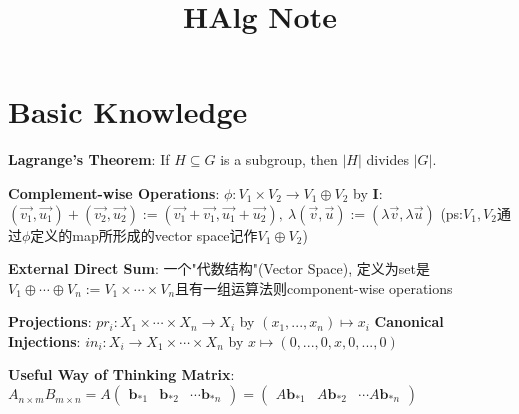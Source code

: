 \documentclass[9pt]{article}
\title{HAlg Note}
\author{}
\date{}
\begin{document}
\newcommand{\bij}{\stackrel{\sim}{\to}}
\newcommand{\oto}{\hookrightarrow}
\newcommand{\onto}{\twoheadrightarrow}

\newcommand{\np}{{\tiny $^{^{^\ominus}}$}}

\newcommand{\N}{\mathbb{N}}

\maketitle
\thispagestyle{fancy}
\vspace{-3.5cm}

\fontsize{10pt}{11pt}\selectfont
\setlength{\parindent}{8pt}


\section{Basic Knowledge} %

\textbf{Lagrange's Theorem}: {\small If $H\subseteq G$ is a subgroup, then $|H|$ divides $|G|$.} \quad {}

\textbf{\small Complement-wise Operations}: {\scriptsize $\phi:V_1\times V_2\to V_1\oplus V_2$ by \textbf{I}:$(\vec{v_1},\vec{u_1})+(\vec{v_2},\vec{u_2}):=(\vec{v_1}+\vec{v_1},\vec{u_1}+\vec{u_2}), \ \lambda(\vec{v},\vec{u}):=(\lambda\vec{v},\lambda\vec{u})$ {\tiny (ps:$V_1,V_2$通过$\phi$定义的map所形成的vector space记作$V_1\oplus V_2$)}}

\textbf{External Direct Sum}: {\small 一个"代数结构"(Vector Space), 定义为set是$V_1\oplus\cdots\oplus V_n:=V_1\times\cdots\times V_n$且有一组运算法则component-wise operations}

\textbf{Projections}: $pr_i:X_1\times\cdots\times X_n\to X_i$ by $(x_1,...,x_n)\mapsto x_i$ \quad \textbf{Canonical Injections}: $in_i:X_i\to X_1\times\cdots\times X_n$ by $x\mapsto(0,...,0,x,0,...,0)$

\textbf{Useful Way of Thinking Matrix}: {\scriptsize $A_{n\times m}B_{m\times n}=A\begin{pmatrix}\mathbf{b}_{*1} & \mathbf{b}_{*2} & \cdots \mathbf{b}_{*n} \end{pmatrix}=\begin{pmatrix}A\mathbf{b}_{*1} & A\mathbf{b}_{*2} & \cdots A\mathbf{b}_{*n} \end{pmatrix}$} \qquad{}
\end{document}
